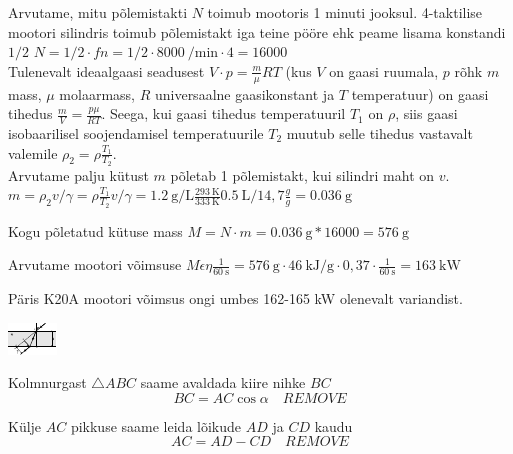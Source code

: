 \documentclass[10pt]{article}
\newcommand{\p}[1]{REMOVE}
\begin{document}
\solu
Arvutame, mitu põlemistakti $N$ toimub mootoris 1 minuti jooksul. 4-taktilise mootori silindris toimub põlemistakt iga teine pööre ehk peame lisama konstandi $1/2$
$N = 1/2\cdot f n = 1/2\cdot \SI{8000}{\per\minute}\cdot 4= 16000$\\
Tulenevalt ideaalgaasi seadusest $V \cdot p = \frac{m}{\mu}RT$ (kus $V$ on gaasi ruumala, $p$ rõhk $m$ mass, $\mu$ molaarmass, $R$ universaalne gaasikonstant ja $T$ temperatuur) on gaasi tihedus $\frac{m}{V} = \frac{p\mu}{RT}$. Seega, kui gaasi tihedus temperatuuril $T_1$ on $\rho$, siis gaasi isobaarilisel soojendamisel temperatuurile $T_2$ muutub selle tihedus vastavalt valemile $\rho_2 = \rho \frac{T_1}{T_2}$. \\
Arvutame palju kütust $m$ põletab 1 põlemistakt, kui silindri maht on $v$.
$m = \rho_2v /\gamma  = \rho \frac{T_1}{T_2}v /\gamma  = \SI{1,2}{\gram\per\liter} \frac{\SI{293}{\kelvin}}{\SI{333}{\kelvin}} \SI{0,5}{\liter} / 14,7 \frac{g}{g} = \SI{0,036}{\gram}$

Kogu põletatud kütuse mass $M = N\cdot m = \SI{0,036}{\gram} * 16000 = \SI{576}{\gram}$

Arvutame mootori võimsuse  
$M \epsilon \eta \frac{1}{\SI{60}{\second}} = \SI{576}{\gram}\cdot\SI{46}{\kilo\joule\per\gram}\cdot 0,37\cdot \frac{1}{\SI{60}{\second}}=\SI{163}{\kilo\watt}$ 

Päris K20A mootori võimsus ongi umbes 162-165 kW olenevalt variandist.
\probend
\bigskip


\solu
\begin{center}
\includegraphics[width=0.5\linewidth]{2023-v2g-06-yl.pdf}
\end{center}
  
Kolmnurgast $\triangle{ABC}$ saame avaldada kiire nihke $BC$\\
\[ BC = AC \cos{\alpha} \quad \p{2}\]

Külje $AC$ pikkuse saame leida lõikude $AD$ ja $CD$ kaudu
\[ AC = AD - CD  \quad \p{1}\]
\end{document}
